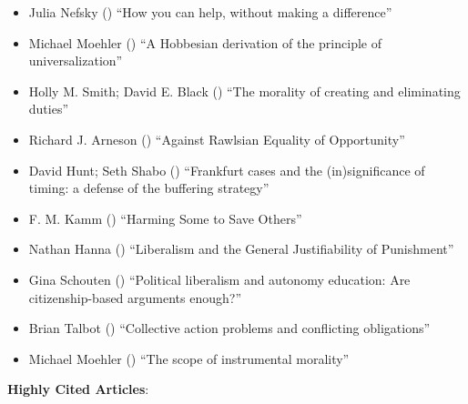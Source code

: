 \documentclass[
  10pt,
  letterpaper,
  DIV=11,
  numbers=noendperiod,
  twoside]{scrartcl}
\providecommand{\tightlist}{%
  \setlength{\itemsep}{0pt}\setlength{\parskip}{0pt}}\usepackage{longtable,booktabs,array}
\begin{document}
\begin{itemize}
\tightlist
\item
  Julia Nefsky () ``How you can
  help, without making a difference''
\item
  Michael Moehler () ``A
  Hobbesian derivation of the principle of universalization''
\item
  Holly M. Smith; David E. Black
  () ``The morality of creating
  and eliminating duties''
\item
  Richard J. Arneson () ``Against
  Rawlsian Equality of Opportunity''
\item
  David Hunt; Seth Shabo ()
  ``Frankfurt cases and the (in)significance of timing: a defense of the
  buffering strategy''
\item
  F. M. Kamm () ``Harming Some to
  Save Others''
\item
  Nathan Hanna () ``Liberalism
  and the General Justifiability of Punishment''
\item
  Gina Schouten () ``Political
  liberalism and autonomy education: Are citizenship-based arguments
  enough?''
\item
  Brian Talbot () ``Collective
  action problems and conflicting obligations''
\item
  Michael Moehler () ``The scope
  of instrumental morality''
\end{itemize}

\textbf{Highly Cited Articles}:
\end{document}
